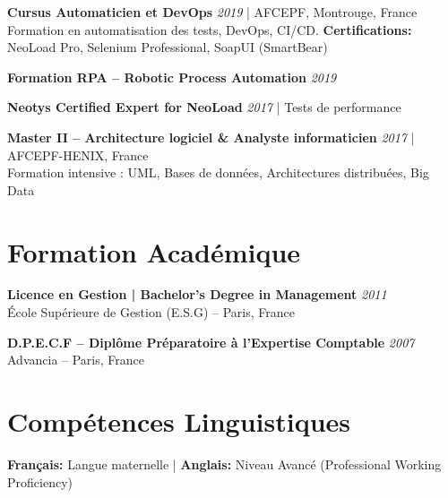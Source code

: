 \documentclass[11pt,a4paper]{article}
\begin{document}
\textbf{Cursus Automaticien et DevOps} \hfill \textit{2019} | AFCEPF, Montrouge, France\\
Formation en automatisation des tests, DevOps, CI/CD. \textbf{Certifications:} NeoLoad Pro, Selenium Professional, SoapUI (SmartBear)

\textbf{Formation RPA -- Robotic Process Automation} \hfill \textit{2019}

\textbf{Neotys Certified Expert for NeoLoad} \hfill \textit{2017} | Tests de performance

\textbf{Master II -- Architecture logiciel \& Analyste informaticien} \hfill \textit{2017} | AFCEPF-HENIX, France\\
Formation intensive : UML, Bases de données, Architectures distribuées, Big Data

\section*{Formation Académique}

\textbf{Licence en Gestion | Bachelor's Degree in Management} \hfill \textit{2011}\\
École Supérieure de Gestion (E.S.G) -- Paris, France

\textbf{D.P.E.C.F -- Diplôme Préparatoire à l'Expertise Comptable} \hfill \textit{2007}\\
Advancia -- Paris, France

\section*{Compétences Linguistiques}

\textbf{Français:} Langue maternelle | \textbf{Anglais:} Niveau Avancé (Professional Working Proficiency)
\end{document}
